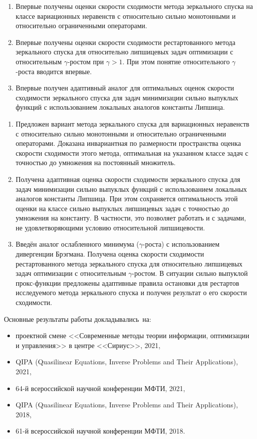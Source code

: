 {\novelty}
\begin{enumerate}[beginpenalty=10000] %
  \item Впервые получены оценки скорости сходимости метода зеркального спуска на классе вариационных неравенств с относительно сильно монотонными и относительно ограниченными операторами.
  \item Впервые получены оценки скорости сходимости рестартованного метода зеркального спуска для относительно липшицевых задач оптимизации с относительным $\gamma$-ростом при $\gamma > 1$. При этом понятие относительного $\gamma$-роста вводится впервые. 
  \item Впервые получен адаптивный аналог для оптимальных оценок скорости сходимости зеркального спуска для задач минимизации сильно выпуклых функций с использованием локальных аналогов константы Липшица.
\end{enumerate}

{}
\begin{enumerate}[beginpenalty=10000] %
  \item Предложен вариант метода зеркального спуска для вариационных неравенств с относительно сильно монотонными и относительно ограниченными операторами. Доказана инвариантная по размерности пространства оценка скорости сходимости этого метода, оптимальная на указанном классе задач с точностью до умножения на постоянный множитель.
  \item Получена адаптивная оценка скорости сходимости зеркального спуска для задач минимизации сильно выпуклых функций с использованием локальных аналогов константы Липшица. При этом сохраняется оптимальность этой оценки на классе сильно выпуклых липшицевых задач с точностью до умножения на константу. В частности, это позволяет работать и с задачами, не удовлетворяющими условию относительной липшицевости.
  \item Введён аналог ослабленного минимума ($\gamma$-роста) с использованием дивергенции Брэгмана. Получена оценка скорости сходимости рестартованного метода зеркального спуска для относительно липшицевых задач оптимизации с относительным $\gamma$-ростом. В ситуации сильно выпуклой прокс-функции предложены адаптивные правила остановки для рестартов исследуемого метода зеркального спуска и получен результат о его скорости сходимости.
\end{enumerate}

{\probation}
Основные результаты работы докладывались~на:
\begin{itemize}
    \item проектной смене <<Современные методы теории информации, оптимизации и управления>> в центре <<Сириус>>, 2021,
    \item QIPA (Quasilinear Equations, Inverse Problems and Their Applications), 2021,
    \item 64-й всероссийской научной конференции МФТИ, 2021,
    \item QIPA (Quasilinear Equations, Inverse Problems and Their Applications), 2018,
    \item 61-й всероссийской научной конференции МФТИ, 2018.
\end{itemize}

